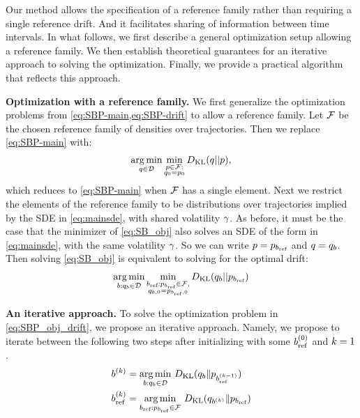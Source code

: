
Our method allows the specification of a reference family rather than requiring a single reference drift. And it facilitates sharing of information between time intervals. In what follows, we first describe a general optimization setup allowing a reference family. We then establish theoretical guarantees for an iterative approach to solving the optimization. Finally, we provide a practical algorithm that reflects this approach.


\textbf{Optimization with a reference family.} We first generalize the optimization problems from \cref{eq:SBP-main,eq:SBP-drift} to allow a reference family. Let $\mathcal{F}$ be the chosen reference family of densities over trajectories. Then we replace \cref{eq:SBP-main} with:
\begin{align}
    \label{eq:SB_obj}
    \operatorname*{arg\,min}_{q\in \mathcal{D}} \min_{\substack{p\in\mathcal{F}:\\ q_{0} = p_{0}}}
    D_{\mathrm{KL}}(q||p),
\end{align}
which reduces to \cref{eq:SBP-main} when $\mathcal{F}$ has a single element.
Next we restrict the elements of the reference family to be distributions over trajectories implied by the SDE in \cref{eq:mainsde}, with shared volatility $\gamma$. As before, it must be the case that the minimizer of \cref{eq:SB_obj} also solves an SDE of the form in \cref{eq:mainsde}, with the same volatility $\gamma$. So we can write $\refden=\refden_{\refdrift}$ and $\bridge=\bridge_{\modeldrift}$. Then solving \cref{eq:SB_obj} is equivalent to solving for the optimal drift:
\begin{align}
    \label{eq:SBP_obj_drift}
    \argmin_{\modeldrift: \bridge_{\modeldrift} \in \measurefamily} \min_{\substack{\refdrift:\refden_{\refdrift}\in\modelfamily,\\\bridge_{\modeldrift,0}=\refden_{\refdrift,0}}} \KL(\bridge_{\modeldrift}||\refden_{\refdrift} )
\end{align}


\textbf{An iterative approach.} To solve the optimization problem in \cref{eq:SBP_obj_drift}, we propose an iterative approach. Namely, we propose to iterate between the following two steps after initializing with some $\refdrift^{(0)}$ and $k=1$. %
\begin{align}
    \drift^{(\iteralgo)} &= \argmin_{ \drift: \bridge_{\drift} \in \measurefamily} \, \KL(\bridge_{\drift} \| \refden_{\refdrift^{(\iteralgo-1)}})\label{eq:first-proj}\\
    \refdrift^{(\iteralgo)} &= \argmin_{\refdrift: \refden_{\refdrift}\in\modelfamily} \, \KL(\bridge_{\drift^{(\iteralgo)}} \| \refden_{\refdrift})\label{eq:second-proj}
\end{align}

